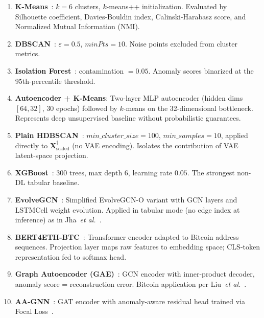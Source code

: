 \begin{enumerate}[leftmargin=*, label=\textbf{B\arabic*}]

  \item \textbf{K-Means}~\cite{Lloyd1982}: $k = 6$ clusters, $k$-means++
    initialization. Evaluated by Silhouette coefficient, Davies-Bouldin index,
    Calinski-Harabasz score, and Normalized Mutual Information (NMI).

  \item \textbf{DBSCAN}~\cite{Ester1996}: $\varepsilon = 0.5$,
    $\textit{minPts} = 10$. Noise points excluded from cluster metrics.

  \item \textbf{Isolation Forest}~\cite{Liu2008}: contamination $= 0.05$.
    Anomaly scores binarized at the 95th-percentile threshold.

  \item \textbf{Autoencoder + K-Means}: Two-layer MLP autoencoder
    (hidden dims $[64, 32]$, 30 epochs) followed by $k$-means on the
    32-dimensional bottleneck. Represents deep unsupervised baseline without
    probabilistic guarantees.

  \item \textbf{Plain HDBSCAN}~\cite{McInnes2017}: $\textit{min\_cluster\_size}
    = 100$, $\textit{min\_samples} = 10$, applied directly to
    $\mathbf{X}^{\dagger}_{\text{scaled}}$ (no VAE encoding).
    Isolates the contribution of VAE latent-space projection.

  \item \textbf{XGBoost}~\cite{Chen2016}: $300$ trees, max depth $6$,
    learning rate $0.05$. The strongest non-DL tabular baseline.

  \item \textbf{EvolveGCN}~\cite{Pareja2020}: Simplified EvolveGCN-O variant
    with GCN layers and LSTMCell weight evolution.
    Applied in tabular mode (no edge index at inference) as in
    Jha~\emph{et al.}~\cite{Jha2023}.

  \item \textbf{BERT4ETH-BTC}~\cite{He2023}: Transformer encoder adapted
    to Bitcoin address sequences.  Projection layer maps raw features to
    embedding space; CLS-token representation fed to softmax head.

  \item \textbf{Graph Autoencoder (GAE)}~\cite{Kipf2016b}: GCN encoder
    with inner-product decoder, anomaly score = reconstruction error.
    Bitcoin application per Liu~\emph{et al.}~\cite{Liu2024}.

  \item \textbf{AA-GNN}~\cite{Fan2024}: GAT encoder with anomaly-aware
    residual head trained via Focal Loss~\cite{Lin2017}.

\end{enumerate}

